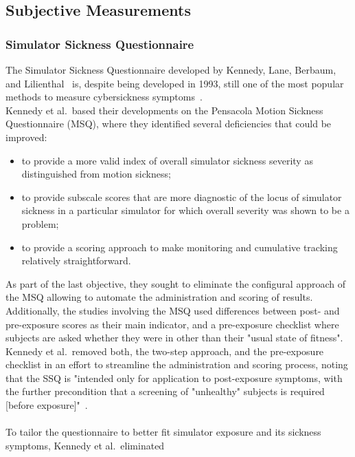 \subsection{Subjective Measurements}\label{subsec:subjective-measurements}

\subsubsection{Simulator Sickness Questionnaire}\label{subsubsec:simulator-sickness-questionnaire}

The Simulator Sickness Questionnaire developed by Kennedy, Lane, Berbaum, and Lilienthal~\cite{Kennedy1993} is,
despite being developed in 1993, still one of the most popular methods to measure cybersickness
symptoms~\cite{Saredakis2020}.
\\
Kennedy et al.\ based their developments on the Pensacola Motion Sickness Questionnaire (MSQ), where they identified
several deficiencies that could be improved:
\begin{itemize}
    \item to provide a more valid index of overall simulator sickness severity as distinguished from motion sickness;
    \item to provide subscale scores that are more diagnostic of the locus of simulator sickness in a particular
    simulator for which overall severity was shown to be a problem;
    \item to provide a scoring approach to make monitoring and cumulative tracking relatively straightforward.
\end{itemize}
As part of the last objective, they sought to eliminate the configural approach of the MSQ allowing to automate the
administration and scoring of results.
\\
Additionally, the studies involving the MSQ used differences between post- and pre-exposure scores as their main
indicator, and a pre-exposure checklist where subjects are asked whether they were in other than their "usual state 
of fitness".
Kennedy et al.\ removed both, the two-step approach, and the pre-exposure checklist in an effort to streamline the
administration and scoring process, noting that the SSQ is "intended only for application to post-exposure symptoms,
with the further precondition that a screening of "unhealthy" subjects is required [before exposure]"~\cite[p.
207]{Kennedy1993}.
\\
\\
To tailor the questionnaire to better fit simulator exposure and its sickness symptoms, Kennedy et al.\ eliminated
